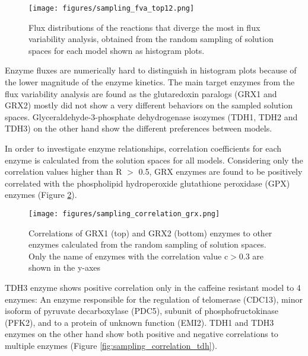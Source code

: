 \begin{figure}[H]
  \begin{center}
  \texttt{[image: figures/sampling\_fva\_top12.png]}
  \caption[Flux distributions of the reactions that diverge the most in flux variability analysis, obtained from the random sampling of solution spaces for each model shown as histogram plots]{Flux distributions of the reactions that diverge the most in flux variability analysis, obtained from the random sampling of solution spaces for each model shown as histogram plots.}
  \label{fig:sampling_fva_top12}
  \end{center}
\end{figure}

Enzyme fluxes are numerically hard to distinguish in histogram plots because of the lower magnitude of the enzyme kinetics. The main target enzymes from the flux variability analysis are found as the glutaredoxin paralogs (GRX1 and GRX2) mostly did not show a very different behaviors on the sampled solution spaces. Glyceraldehyde-3-phosphate dehydrogenase isozymes (TDH1, TDH2 and TDH3) on the other hand show the different preferences between models.

In order to investigate enzyme relationships, correlation coefficients for each enzyme is calculated from the solution spaces for all models. Considering only the correlation values higher than R $>$ 0.5, GRX enzymes are found to be positively correlated with the phospholipid hydroperoxide glutathione peroxidase (GPX) enzymes (Figure \ref{fig:sampling_correlation_grx}).

\begin{figure}[H]
  \begin{center}
  \texttt{[image: figures/sampling\_correlation\_grx.png]}
  \caption[Correlations of GRX1 (top) and GRX2 (bottom) enzymes to other enzymes calculated from the random sampling of solution spaces. Only the name of enzymes with the correlation value c$>$0.8 are shown in the y-axes]{Correlations of GRX1 (top) and GRX2 (bottom) enzymes to other enzymes calculated from the random sampling of solution spaces. Only the name of enzymes with the correlation value c$>$0.3 are shown in the y-axes}
  \label{fig:sampling_correlation_grx}
  \end{center}
\end{figure}

TDH3 enzyme shows positive correlation only in the caffeine resistant model to 4 enzymes: An enzyme responsible for the regulation of telomerase (CDC13), minor isoform of pyruvate decarboxylase (PDC5), subunit of phosphofructokinase (PFK2), and to a protein of unknown function (EMI2). TDH1 and TDH3 enzymes on the other hand show both positive and negative correlations to multiple enzymes (Figure \ref{fig:sampling_correlation_tdh}).

